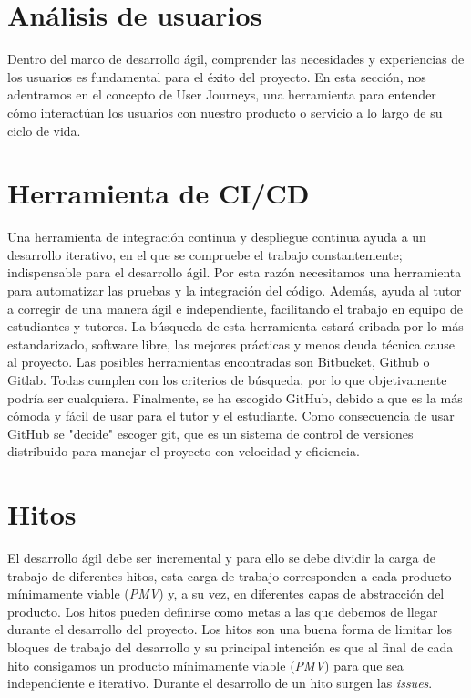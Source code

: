 \section{Análisis de usuarios}
Dentro del marco de desarrollo ágil, comprender las necesidades y experiencias de los usuarios es fundamental para el éxito del proyecto.
En esta sección, nos adentramos en el concepto de User Journeys, una herramienta para entender cómo interactúan los usuarios con nuestro producto o servicio a lo largo de su ciclo de vida.



\section{Herramienta de CI/CD}
Una herramienta de integración continua y despliegue continua ayuda a un desarrollo iterativo, en el que se compruebe el trabajo constantemente; indispensable para el desarrollo ágil.
Por esta razón necesitamos una herramienta para automatizar las pruebas y la integración del código. Además, ayuda al tutor a corregir de una manera ágil e independiente, facilitando el trabajo en equipo de estudiantes y tutores.
La búsqueda de esta herramienta estará cribada por lo más estandarizado, software libre, las mejores prácticas y menos deuda técnica cause al proyecto.
Las posibles herramientas encontradas son Bitbucket, Github o Gitlab. Todas cumplen con los criterios de búsqueda, por lo que objetivamente podría ser cualquiera.
Finalmente, se ha escogido GitHub, debido a que es la más cómoda y fácil de usar para el tutor y el estudiante.
Como consecuencia de usar GitHub se "decide" escoger git, que es un sistema de control de versiones distribuido para manejar el proyecto con velocidad y eficiencia.

\section{Hitos}
\label{sec:hitos}
El desarrollo ágil debe ser incremental y para ello se debe dividir la carga de trabajo de diferentes hitos, esta carga
de trabajo corresponden a cada producto mínimamente viable (\textit{PMV}) y, a su vez, en diferentes capas de abstracción del producto.
Los hitos pueden definirse como metas a las que debemos de llegar durante el desarrollo del proyecto.
Los hitos son una buena forma de limitar los bloques de trabajo del desarrollo y su principal intención es que
al final de cada hito consigamos un producto mínimamente viable (\textit{PMV}) para que sea independiente e iterativo.
Durante el desarrollo de un hito surgen las \textit{issues}.

